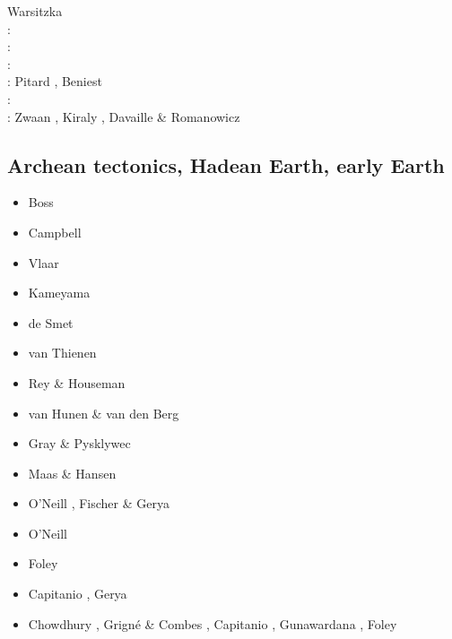 {                    Warsitzka \etal \cite{wakk13}\\
\twothousandfifteen: \cite{casw15}\cite{rods15}\cite{kiff15}\cite{chsd15}\\
\twothousandsixteen: \cite{scbb16}\cite{chss16}\\
\twothousandseventeen: \cite{casw17}\\
\twothousandeighteen: Pitard \etal \cite{pirf18}, Beniest \etal \cite{bews18} \\
\twothousandnineteen: \cite{mocb19}\cite{sccs19}\cite{muwm19}\cite{fegb19}\\
\twothousandtwenty: Zwaan \etal \cite{zwsr20}, Kiraly \etal \cite{kiph20},
                    Davaille \& Romanowicz \cite{daro20}
}

\subsection{Archean tectonics, Hadean Earth, early Earth}

\begin{scriptsize}
\begin{itemize}
\item[\nineteeneightyfour] Boss \etal \cite{boas84}
\item[\nineteeneightynine] Campbell \etal \cite{cagh89}
\item[\nineteenninetyfour] Vlaar \etal \cite{vlvv94}
\item[\nineteenninetysix] Kameyama \etal \cite{kafo96}
\item[\twothousand] de Smet \etal \cite{devv00b}
\item[\twothousandfour] van Thienen \etal \cite{vavv04,vavv04b}
\item[\twothousandsix] Rey \& Houseman \cite{reho06}
\item[\twothousandeight] van Hunen \& van den Berg \cite{vava08}
\item[\twothousandten] Gray \& Pysklywec \cite{grpy10}
\item[\twothousandfifteen] Maas \& Hansen \cite{maha15}
\item[\twothousandsixteen] O'Neill \cite{onlw16}, Fischer \& Gerya \cite{fige16}
\item[\twothousandseventeen] O'Neill \etal \cite{onmz17}
\item[\twothousandeighteen] Foley \cite{fole18} 
\item[\twothousandnineteen] Capitanio \etal \cite{canc19}, Gerya \cite{gery19}
\item[\twothousandtwenty] Chowdhury \etal{} \cite{chcg20}, Grign\'e \& Combes \cite{grco20},
                          Capitanio \etal \cite{canc20}, Gunawardana \etal \cite{gumc20},
                          Foley \cite{fole20}
\end{itemize}
\end{scriptsize}

